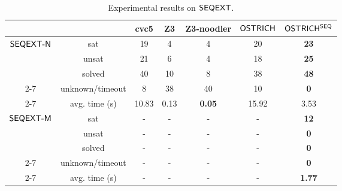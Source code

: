 \begin{table}[t]
\setlength{\tabcolsep}{2pt}
\caption{Experimental results on ${\sf SEQEXT}$.
}
\centering
    \begin{tabular}{| c| c| c | c | c | c| c|}
      \hline
                                              &                 & cvc5  & Z3   & Z3-noodler    & ${\sf OSTRICH}$ & ${\sf OSTRICH^{SEQ}}$ \\
      \hline
      \multirow{3}{*}{${\sf SEQEXT}\mbox{\sf -N}$} & sat             & 19    & 4    & 4             & 20         & \textbf{23}   \\
      \cline{2-7}
                                              & unsat           & 21    & 6    & 4             & 18         & \textbf{25}   \\
      \cline{2-7}
                                              & solved          & 40    & 10   & 8             & 38         & \textbf{48}   \\
      \cline{2-7}
                                              & unknown/timeout & 8     & 38   & 40            & 10         & \textbf{0}    \\
      \cline{2-7}
                                              & avg. time (s)   & 10.83 & 0.13 & \textbf{0.05} & 15.92      & 3.53          \\
      \hline
      \multirow{3}{*}{${\sf SEQEXT}\mbox{\sf -M}$} & sat             & -     & -    & -             & -          & \textbf{12}   \\
      \cline{2-7}
                                              & unsat           & -     & -    & -             & -          & \textbf{0}    \\
      \cline{2-7}
                                              & solved          & -     & -    & -             & -          & \textbf{0}    \\
      \cline{2-7}
                                              & unknown/timeout & -     & -    & -             & -          & \textbf{0}    \\
      \cline{2-7}
                                              & avg. time (s)   & -     & -    & -             & -          & \textbf{1.77} \\
      \hline
    \end{tabular}
  \label{tab:seq-ext}
\end{table}


